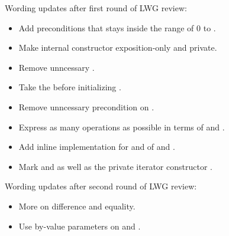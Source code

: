 \begin{revision}
\item Wording updates after first round of LWG review:
  \begin{itemize}
    \item Add preconditions that  stays inside the range of 0 to .
    \item Make internal constructor exposition-only and private.
    \item Remove unncessary \std.
    \item Take the  before initializing .
    \item Remove unncessary precondition on .
    \item Express as many operations as possible in terms of \code{+=} and \code{-=}.
    \item Add inline implementation for  and  of
       and .
    \item Mark  and  as well as the private iterator constructor .
  \end{itemize}
\item Wording updates after second round of LWG review:
  \begin{itemize}
    \item More  on difference and equality.
    \item Use by-value parameters on \code{+} and \code{-}.
  \end{itemize}
\end{revision}
